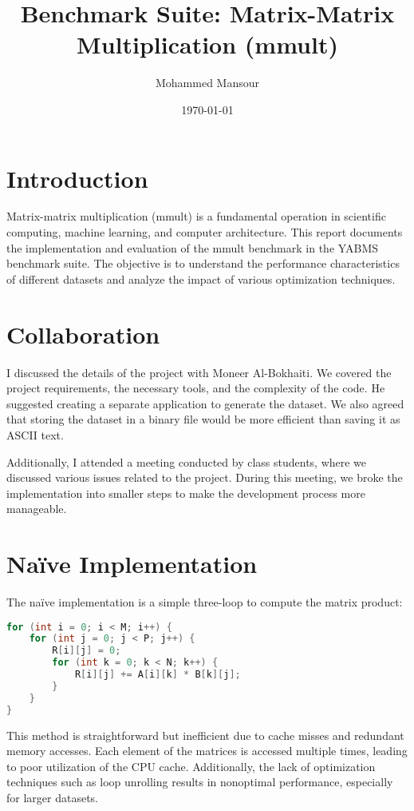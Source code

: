 \documentclass[12pt]{article}
\title{Benchmark Suite: Matrix-Matrix Multiplication (mmult)}
\author{Mohammed Mansour}
\date{\today}
\begin{document}
\maketitle

\section{Introduction}
Matrix-matrix multiplication (mmult) is a fundamental operation in scientific computing, machine learning, and computer architecture. This report documents the implementation and evaluation of the mmult benchmark in the YABMS benchmark suite. The objective is to understand the performance characteristics of different datasets and analyze the impact of various optimization techniques.

\section{Collaboration}
I discussed the details of the project with Moneer Al-Bokhaiti. We covered the project requirements, the necessary tools, and the complexity of the code. He suggested creating a separate application to generate the dataset. We also agreed that storing the dataset in a binary file would be more efficient than saving it as ASCII text.

Additionally, I attended a meeting conducted by class students, where we discussed various issues related to the project. During this meeting, we broke the implementation into smaller steps to make the development process more manageable.

\section{Naïve Implementation}
The naïve implementation is a simple three-loop to compute the matrix product:
\begin{lstlisting}[language=C, style=customc, caption=Naïve mmult implementation]
for (int i = 0; i < M; i++) {
    for (int j = 0; j < P; j++) {
        R[i][j] = 0;
        for (int k = 0; k < N; k++) {
            R[i][j] += A[i][k] * B[k][j];
        }
    }
}
\end{lstlisting}

This method is straightforward but inefficient due to cache misses and redundant memory accesses. Each element of the matrices is accessed multiple times, leading to poor utilization of the CPU cache. Additionally, the lack of optimization techniques such as loop unrolling results in nonoptimal performance, especially for larger datasets.
\end{document}
